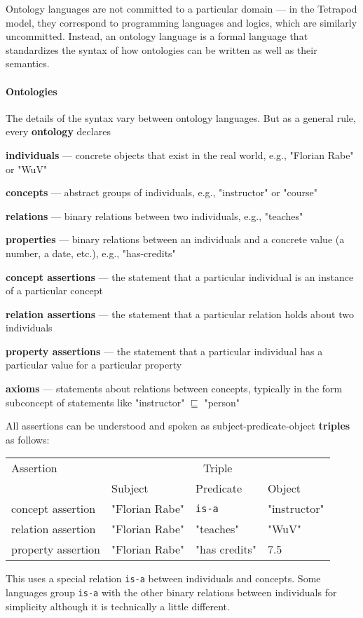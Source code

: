 Ontology languages are not committed to a particular domain --- in the Tetrapod model, they correspond to programming languages and logics, which are similarly uncommitted.
Instead, an ontology language is a formal language that standardizes the syntax of how ontologies can be written as well as their semantics.

\paragraph{Ontologies}
The details of the syntax vary between ontology languages.
But as a general rule, every \textbf{ontology} declares
\begin{compactitem}
 \item \textbf{individuals} --- concrete objects that exist in the real world, e.g., "Florian Rabe" or "WuV"
 \item \textbf{concepts} --- abstract groups of individuals, e.g., "instructor" or "course"
 \item \textbf{relations} --- binary relations between two individuals, e.g., "teaches"
 \item \textbf{properties} --- binary relations between an individuals and a concrete value (a number, a date, etc.), e.g., "has-credits"
 \item \textbf{concept assertions} --- the statement that a particular individual is an instance of a particular concept
 \item \textbf{relation assertions} --- the statement that a particular relation holds about two individuals
 \item \textbf{property assertions} --- the statement that a particular individual has a particular value for a particular property
 \item \textbf{axioms} --- statements about relations between concepts, typically in the form subconcept of statements like "instructor" $\sqsubseteq$ "person"
\end{compactitem}

All assertions can be understood and spoken as subject-predicate-object \textbf{triples} as follows:
\begin{center}
\begin{tabular}{l|lll}
Assertion & \multicolumn{3}{c}{Triple} \\
          & Subject & Predicate & Object \\
\hline
concept assertion  & "Florian Rabe" & \texttt{is-a} & "instructor" \\
relation assertion & "Florian Rabe" & "teaches" & "WuV" \\
property assertion & "Florian Rabe" & "has credits" & 7.5 \\
\end{tabular}
\end{center}
This uses a special relation \texttt{is-a} between individuals and concepts.
Some languages group \texttt{is-a} with the other binary relations between individuals for simplicity although it is technically a little different.

